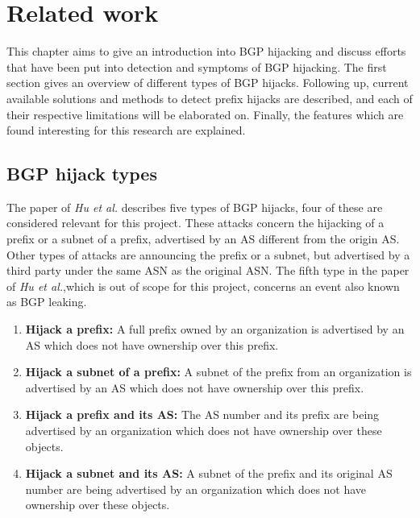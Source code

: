 \chapter{Related work}\label{ch:related}
This chapter aims to give an introduction into BGP hijacking and discuss efforts that have been put into detection and symptoms of BGP hijacking. The first section gives an overview of different types of BGP hijacks. Following up, current available solutions and methods to detect prefix hijacks are described, and each of their respective limitations will be elaborated on. Finally, the features which are found interesting for this research are explained.\par

\section{BGP hijack types}\label{sec:hijacks}
The paper of \emph{Hu et al.} \cite{hu2007accurate} describes five types of BGP hijacks, four of these are considered relevant for this project. These attacks concern the hijacking of a prefix or a subnet of a prefix, advertised by an AS different from the origin AS. Other types of attacks are announcing the prefix or a subnet, but advertised by a third party under the same ASN as the original ASN. The fifth type in the paper of \emph{Hu et al.},which is out of scope for this project, concerns an event also known as BGP leaking\cite{ballani2007study}.

\begin{enumerate}
	\item \textbf{Hijack a prefix:} A full prefix owned by an organization is advertised by an AS which does not have ownership over this prefix.
	\item \textbf{Hijack a subnet of a prefix:} A subnet of the prefix from an organization is advertised by an AS which does not have ownership over this prefix.
	\item \textbf{Hijack a prefix and its AS:} The AS number and its prefix are being advertised by an organization which does not have ownership over these objects.
	\item \textbf{Hijack a subnet and its AS:} A subnet of the prefix and its original AS number are being advertised by an organization which does not have ownership over these objects.
\end{enumerate}

